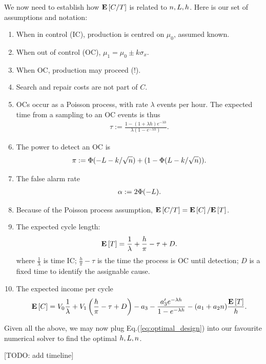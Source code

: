 \begin{extra}
We now need to establish how $\mathbf{E}\left[ C/T \right]$ is related to $n,L,h$. Here is our set of assumptions and notation:
\begin{enumerate}
\item When in control (IC), production is centred on $\mu_0$, assumed known. 
\item When out of control (OC), $\mu_1=\mu_0 \pm k \sigma_x$. 
\item When OC, production may proceed (!). 
\item Search and repair costs are not part of $C$.
\item OCs occur as a Poisson process, with rate $\lambda$ events per hour. The expected time from a sampling to an OC events is thus 
\begin{align}
	\tau := \frac{1-(1+ \lambda h) e^{-\lambda h}}{\lambda(1-e^{-\lambda h})}.
\end{align} 
\item The power to detect an OC is 
\begin{align}
	\pi:= \Phi(-L-k/\sqrt{n})+ (1-\Phi(L-k/\sqrt{n})).
\end{align}
\item The false alarm rate
\begin{align}
	\alpha:= 2 \Phi(-L).
\end{align}
\item Because of the Poisson process assumption,  $\mathbf{E}\left[ C/T \right]=\mathbf{E}\left[ C \right]/\mathbf{E}\left[ T \right]$. 
\item The expected cycle length:
\begin{align}
	\mathbf{E}\left[ T \right]= \frac{1}{\lambda}+ \frac{h}{\pi}- \tau  + D.
\end{align}
where $\frac{1}{\lambda}$ is time IC;
$\frac{h}{\pi}- \tau$ is the time the process is OC until detection;
$D$ is a fixed time to identify the assignable cause. 
\item The expected income per cycle
\begin{align*}
	\mathbf{E}\left[ C \right]= V_0 \frac{1}{\lambda} + 
	V_1 \left(\frac{h}{\pi}- \tau  + D  \right) - 
	a_3 -
	\frac{a'_3 e^{-\lambda h}}{1-e^{-\lambda h}} -
	(a_1+a_2n)\frac{\mathbf{E}\left[ T \right]}{h}.
\end{align*}
\end{enumerate}

Given all the above, we may now plug Eq.(\ref{eq:optimal_design}) into our favourite numerical solver to find the optimal $h,L,n$.

[TODO: add timeline]

\end{extra}






